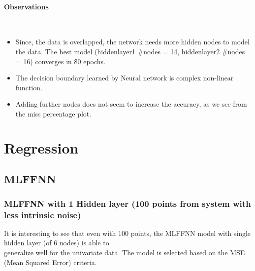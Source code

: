 \documentclass[fleqn]{article}
\newcommand{\myparagraph}[1]{\paragraph{#1}\mbox{}\\}
\begin{document}
\myparagraph{Observations}

\begin{itemize}
  \item Since, the data is overlapped, the network needs more hidden nodes to model the data. The best model (hiddenlayer1 \#nodes = 14, hiddenlayer2 \#nodes = 16) converges in \~80 epochs. 
  \item The decision boundary learned by Neural network is complex non-linear function.
  \item Adding further nodes does not seem to increase the accuracy, as we see from the miss percentage plot.
\end{itemize}

\clearpage
\newpage
\section{Regression}
\subsection{MLFFNN}

\subsubsection{MLFFNN with 1 Hidden layer (100 points from system with less intrinsic noise)}

It is interesting to see that even with 100 points, the MLFFNN model with single hidden layer (of 6 nodes) is able to \\
generalize well for the univariate data. The model is selected based on the MSE (Mean Squared Error) criteria.
\end{document}
